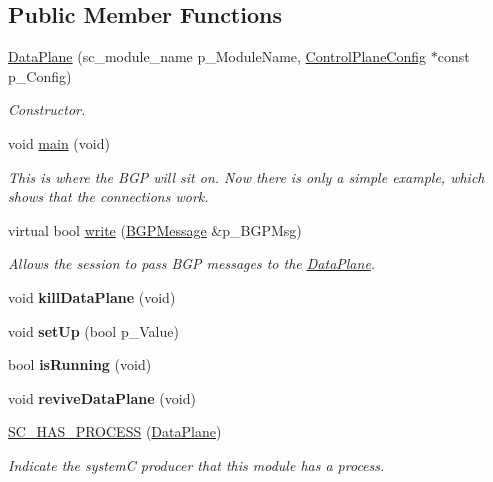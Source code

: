 \subsection*{Public Member Functions}
\begin{DoxyCompactItemize}
\item 
\hyperlink{classDataPlane_a7b191716d490d613fed8a7b206fc5be2}{Data\-Plane} (sc\-\_\-module\-\_\-name p\-\_\-\-Module\-Name, \hyperlink{classControlPlaneConfig}{Control\-Plane\-Config} $\ast$const p\-\_\-\-Config)
\begin{DoxyCompactList}\small\item\em Constructor. \end{DoxyCompactList}\item 
\hypertarget{classDataPlane_a4ac1f9b5b0673d8fe0156d887c105f09}{void \hyperlink{classDataPlane_a4ac1f9b5b0673d8fe0156d887c105f09}{main} (void)}\label{classDataPlane_a4ac1f9b5b0673d8fe0156d887c105f09}

\begin{DoxyCompactList}\small\item\em This is where the B\-G\-P will sit on. Now there is only a simple example, which shows that the connections work. \end{DoxyCompactList}\item 
virtual bool \hyperlink{classDataPlane_a5ffc92484ff41f3ec1a2998ac598fe2f}{write} (\hyperlink{classBGPMessage}{B\-G\-P\-Message} \&p\-\_\-\-B\-G\-P\-Msg)
\begin{DoxyCompactList}\small\item\em Allows the session to pass B\-G\-P messages to the \hyperlink{classDataPlane}{Data\-Plane}. \end{DoxyCompactList}\item 
\hypertarget{classDataPlane_aff4c6aaf53f34f1df596985d3552600d}{void {\bfseries kill\-Data\-Plane} (void)}\label{classDataPlane_aff4c6aaf53f34f1df596985d3552600d}

\item 
\hypertarget{classDataPlane_a2b94563f9a9019377c9f80b58061f422}{void {\bfseries set\-Up} (bool p\-\_\-\-Value)}\label{classDataPlane_a2b94563f9a9019377c9f80b58061f422}

\item 
\hypertarget{classDataPlane_abdda943b9badc67126b2c6a2e5cf4133}{bool {\bfseries is\-Running} (void)}\label{classDataPlane_abdda943b9badc67126b2c6a2e5cf4133}

\item 
\hypertarget{classDataPlane_ad4a0d13e0d6d73ddbbfdd9609a4940ab}{void {\bfseries revive\-Data\-Plane} (void)}\label{classDataPlane_ad4a0d13e0d6d73ddbbfdd9609a4940ab}

\item 
\hyperlink{classDataPlane_ae73b68600990f70ac98e35c19f01fab5}{S\-C\-\_\-\-H\-A\-S\-\_\-\-P\-R\-O\-C\-E\-S\-S} (\hyperlink{classDataPlane}{Data\-Plane})
\begin{DoxyCompactList}\small\item\em Indicate the system\-C producer that this module has a process. \end{DoxyCompactList}\end{DoxyCompactItemize}
